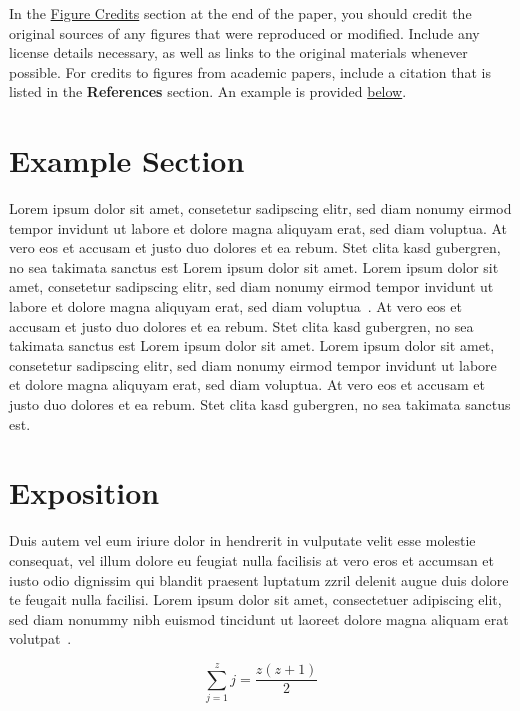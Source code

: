 \documentclass{vgtc}                          %
\begin{document}
In the \hyperref[sec:figure_credits]{Figure Credits} section at the end of the paper, you should credit the original sources of any figures that were reproduced or modified.
Include any license details necessary, as well as links to the original materials whenever possible.
For credits to figures from academic papers, include a citation that is listed in the \textbf{References} section.
An example is provided \hyperref[sec:figure_credits]{below}.

\section{Example Section}

Lorem ipsum dolor sit amet, consetetur sadipscing elitr, sed diam
nonumy eirmod tempor invidunt ut labore et dolore magna aliquyam erat,
sed diam voluptua. At vero eos et accusam et justo duo dolores et ea
rebum. Stet clita kasd gubergren, no sea takimata sanctus est Lorem
ipsum dolor sit amet. Lorem ipsum dolor sit amet, consetetur
sadipscing elitr, sed diam nonumy eirmod tempor invidunt ut labore et
dolore magna aliquyam erat, sed diam
voluptua~\cite{Kitware:2003,Max:1995:OMF}. At vero eos et accusam et
justo duo dolores et ea rebum. Stet clita kasd gubergren, no sea
takimata sanctus est Lorem ipsum dolor sit amet. Lorem ipsum dolor sit
amet, consetetur sadipscing elitr, sed diam nonumy eirmod tempor
invidunt ut labore et dolore magna aliquyam erat, sed diam
voluptua. At vero eos et accusam et justo duo dolores et ea
rebum. Stet clita kasd gubergren, no sea takimata sanctus est.

\section{Exposition}

Duis autem vel eum iriure dolor in hendrerit in vulputate velit esse
molestie consequat, vel illum dolore eu feugiat nulla facilisis at
vero eros et accumsan et iusto odio dignissim qui blandit praesent
luptatum zzril delenit augue duis dolore te feugait nulla
facilisi. Lorem ipsum dolor sit amet, consectetuer adipiscing elit,
sed diam nonummy nibh euismod tincidunt ut laoreet dolore magna
aliquam erat volutpat~\cite{Kindlmann:1999:SAG}.

\begin{equation}
\sum_{j=1}^{z} j = \frac{z(z+1)}{2}
\end{equation}
\end{document}
